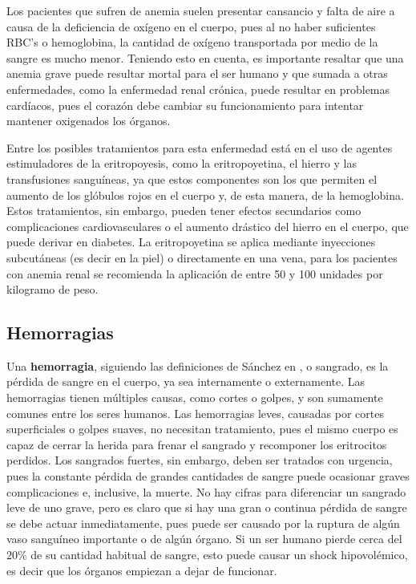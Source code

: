 Los pacientes que sufren de anemia suelen presentar cansancio y falta de aire a causa de la deficiencia de oxígeno en el cuerpo, pues al no haber suficientes RBC's o hemoglobina, la cantidad de oxígeno transportada por medio de la sangre es mucho menor. Teniendo esto en cuenta, es importante resaltar que una anemia grave puede resultar mortal para el ser humano y que sumada a otras enfermedades, como la enfermedad renal crónica, puede resultar en problemas cardíacos, pues el corazón debe cambiar su funcionamiento para intentar mantener oxigenados los órganos.

Entre los posibles tratamientos para esta enfermedad está en el uso de agentes estimuladores de la eritropoyesis, como la eritropoyetina, el hierro y las transfusiones sanguíneas, ya que estos componentes son los que permiten el aumento de los glóbulos rojos en el cuerpo y, de esta manera, de la hemoglobina. Estos tratamientos, sin embargo, pueden tener efectos secundarios como complicaciones cardiovasculares o el aumento drástico del hierro en el cuerpo, que puede derivar en diabetes. La eritropoyetina se aplica mediante inyecciones subcutáneas (es decir en la piel) o directamente en una vena, para los pacientes con anemia renal se recomienda la aplicación de entre 50 y 100 unidades por kilogramo de peso.

\subsection{Hemorragias}\label{subsec:RBC:enfermedades:hemorragias}
Una \textbf{hemorragia}, siguiendo las definiciones de Sánchez en \cite{Sanchez2000Hemorragias}, o sangrado, es la pérdida de sangre en el cuerpo, ya sea internamente o externamente. Las hemorragias tienen múltiples causas, como cortes o golpes, y son sumamente comunes entre los seres humanos. Las hemorragias leves, causadas por cortes superficiales o golpes suaves, no necesitan tratamiento, pues el mismo cuerpo es capaz de cerrar la herida para frenar el sangrado y recomponer los eritrocitos perdidos. Los sangrados fuertes, sin embargo, deben ser tratados con urgencia, pues la constante pérdida de grandes cantidades de sangre puede ocasionar graves complicaciones e, inclusive, la muerte. No hay cifras para diferenciar un sangrado leve de uno grave, pero es claro que si hay una gran o continua pérdida de sangre se debe actuar inmediatamente, pues puede ser causado por la ruptura de algún vaso sanguíneo importante o de algún órgano. Si un ser humano pierde cerca del $20\%$ de su cantidad habitual de sangre, esto puede causar un shock hipovolémico, es decir que los órganos empiezan a dejar de funcionar.

